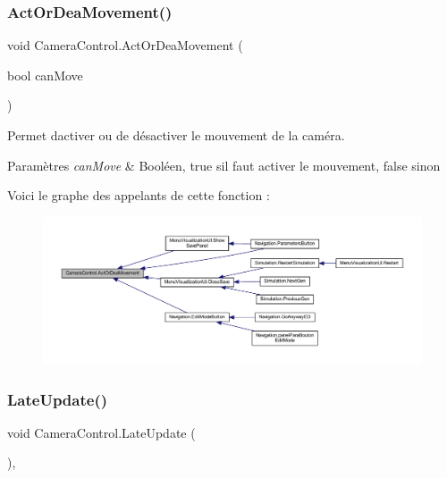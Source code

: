 \subsubsection{\texorpdfstring{Act\+Or\+Dea\+Movement()}{ActOrDeaMovement()}}
{\footnotesize\ttfamily void Camera\+Control.\+Act\+Or\+Dea\+Movement (\begin{DoxyParamCaption}\item[{bool}]{can\+Move }\end{DoxyParamCaption})\hspace{0.3cm}{\ttfamily [inline]}}



Permet d\textquotesingle{}activer ou de désactiver le mouvement de la caméra. 


\begin{DoxyParams}{Paramètres}
{\em can\+Move} & Booléen, true s\textquotesingle{}il faut activer le mouvement, false sinon\\
\hline
\end{DoxyParams}
Voici le graphe des appelants de cette fonction \+:\nopagebreak
\begin{figure}[H]
\begin{center}
\leavevmode
\includegraphics[width=350pt]{class_camera_control_a879e70766aaa6eec8be532ab6712dd6b_icgraph}
\end{center}
\end{figure}
\mbox{\label{class_camera_control_a93058e0f26583cc7355f31467287d374}} 
\subsubsection{\texorpdfstring{Late\+Update()}{LateUpdate()}}
{\footnotesize\ttfamily void Camera\+Control.\+Late\+Update (\begin{DoxyParamCaption}{ }\end{DoxyParamCaption})\hspace{0.3cm}{\ttfamily [inline]}, {\ttfamily [private]}}

